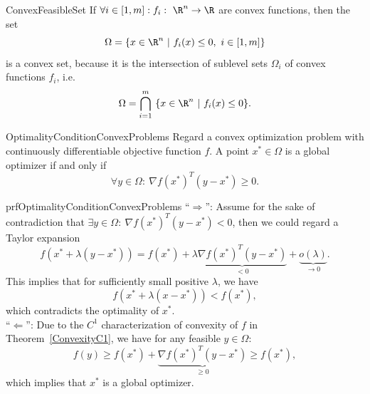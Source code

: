 \begin{ex}{ConvexFeasibleSet}
    If $\forall i \in [1,m]: f_i : \ \R^n \rightarrow \R$ are convex functions, then the set 
    \begin{equation*}
        \Omega = \{x \in \R^n \ | \ f_i(x) \leq 0, \ i \in [1,m]\}
    \end{equation*}
    is a convex set, because it is the intersection of sublevel sets $\Omega_i$ of convex functions $f_i$, i\@.e\@.
    \begin{equation*}
        \Omega 
            = \bigcap_{i=1}^m \ \{x \in \R^n \ | \ f_i(x) \leq 0 \}.
    \end{equation*}
    \vspace{-0.5cm}
\end{ex}


\begin{theo}{OptimalityConditionConvexProblems}
    Regard a convex optimization problem with continuously differentiable objective function $f$. A point $x^* \in \Omega$ is a global optimizer if and only if 
    \begin{equation*}
        \forall y \in \Omega: \ \nabla {f(x^*)}^T(y - x^*) \geq 0.
    \end{equation*} 
    \vspace*{-0.5cm}
\end{theo}


\begin{prf}{prfOptimalityConditionConvexProblems}
    ``$\Rightarrow$'': Assume for the sake of contradiction that $\exists y \in \Omega: \ \nabla {f(x^*)}^T(y - x^*) < 0$, then we could regard a Taylor expansion
    \begin{equation*}
        f(x^* + \lambda(y - x^*)) = f(x^*) + \lambda \underbrace{\nabla {f(x^*)}^T(y - x^*)}_{<0} + \underbrace{o(\lambda)}_{\rightarrow 0}.
    \end{equation*}
   This implies that for sufficiently small positive $\lambda$, we have 
   \begin{equation*}
        f(x^* + \lambda(x - x^*)) < f(x^*),
   \end{equation*}
   which contradicts the optimality of $x^*$. \\

    ``$\Leftarrow$'': 
   Due to the $C^1$ characterization of convexity of $f$ in Theorem~\ref{ConvexityC1}, we have for any feasible $y \in \Omega$: 
   \begin{equation*}
       f(y) \geq f(x^*) + \underbrace{\nabla {f(x^*)}^T(y - x^*)}_{\geq 0} \geq f(x^*),
   \end{equation*}
   which implies that $x^*$ is a global optimizer.
\end{prf}  

